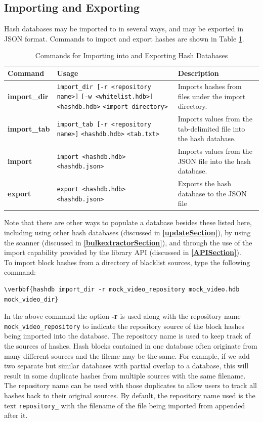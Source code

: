 \documentclass[11pt,fleqn]{article} %
\begin{document}
\subsection{Importing and Exporting}
Hash databases may be imported to in several ways, and may be exported in JSON format.
Commands to import and export hashes are shown in Table \ref{tab:importExport}.\\
\begin{table}[!ht]
\centering
\caption{Commands for Importing into and Exporting Hash Databases}
\label{tab:importExport}
\begin{tabular}{|p{2.5 cm}|p{7 cm}|p{4 cm}|}
\hline \hline
\textbf{Command} & \textbf{Usage} & \textbf{Description} \\
\hline
\textbf{import\_dir} & \verb+import_dir [-r <repository name>]+ \verb+[-w <whitelist.hdb>]+ \verb+<hashdb.hdb>+ \verb+<import directory>+& Imports hashes from files under the import directory.\\
\hline
\textbf{import\_tab} & \verb+import_tab [-r <repository name>]+ \verb+<hashdb.hdb>+ \verb+<tab.txt>+& Imports values from the tab-delimited file into the hash database.\\
\hline
\textbf{import} & \verb+import <hashdb.hdb>+ \verb+<hashdb.json>+& Imports values from the JSON file into the hash database.\\
\hline
\textbf{export} & \verb+export <hashdb.hdb>+ \verb+<hashdb.json>+& Exports the hash database to the JSON file\\
\hline
\end{tabular}
\end{table}
Note that there are other ways to populate a database besides these listed here, including using other hash databases (discussed in \textbf{\autoref{updateSection}}),
by using the \bulk \hdb scanner (discussed in \textbf{\autoref{bulkextractorSection}}),
and through the use of the import capability provided by the \hdb library API (discussed in \textbf{\autoref{APISection}}).\\


To import block hashes from a directory of blacklist sources, type the following command:
\begin{Verbatim}[commandchars=\\\{\}]
\verbbf{hashdb import_dir -r mock_video_repository mock_video.hdb mock_video_dir}
\end{Verbatim}
In the above command the option \textbf{-r} is used along with the repository name \texttt{mock\_video\_repository} to indicate the repository source of the block hashes being imported into the database. The repository name is used to keep track of the sources of hashes. Hash blocks contained in one database often originate from many different sources and the fileme may be the same. For example, if we add two separate but similar databases with partial overlap to a database, this will result in some duplicate hashes from multiple sources with the same filename. The repository name can be used with those duplicates to allow users to track all hashes back to their original sources. By default, the repository name used is the text \texttt{repository\_} with the filename of the file being imported from appended after it.\\
\end{document}
